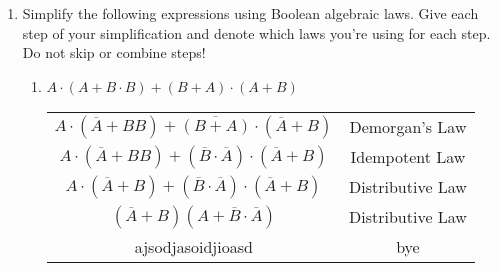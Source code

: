 \documentclass{article}
\begin{document}
    \begin{enumerate}
        \item Simplify the following expressions using Boolean algebraic laws. Give each step of your simplification and denote which laws you’re using for each step. Do not skip or combine steps!
        \begin{enumerate}
            \item $A \cdot (A + B \cdot B) + (B + A) \cdot (A + B)$\\[0.25in]
            \begin{tabular}{c | c}
                $A \cdot (\overline{A} + BB) + \overline{(B+A)} \cdot (\overline{A} + B)$ & Demorgan's Law\\
                $A \cdot (\overline{A} + BB) + (\overline{B} \cdot \overline{A}) \cdot (\overline{A} + B)$ & Idempotent Law\\
                $A \cdot (\overline{A} + B) + (\overline{B} \cdot \overline{A}) \cdot (\overline{A} + B)$ & Distributive Law\\
                $(\overline{A} + B)(A+\overline{B} \cdot \overline{A})$ & Distributive Law\\
                ajsodjasoidjioasd & bye
            \end{tabular}
        \end{enumerate}
    \end{enumerate}
\end{document}

